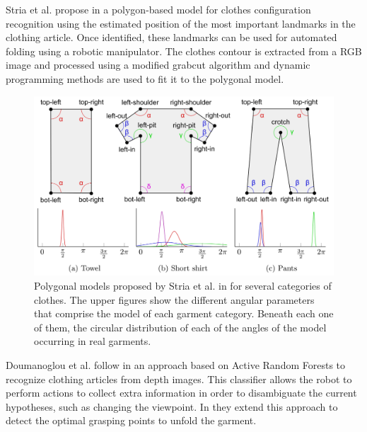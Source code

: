 Stria et al. propose in \cite{Stria2014, Stria2014IROS} a polygon-based model for clothes configuration recognition using the estimated position of the most important landmarks in the clothing article. Once identified, these landmarks can be used for automated folding using a robotic manipulator. The clothes contour is extracted from a RGB image and processed using a modified grabcut algorithm and dynamic programming methods are used to fit it to the polygonal model.

\begin{figure}[thpb]
    \centering
    \includegraphics[width=\textwidth]{figures/SOTA_Stria_2014-3.png}
    \caption[dummy]{Polygonal models proposed by Stria et al. in \cite{Stria2014} for several categories of clothes. The upper figures show the different angular parameters that comprise the model of each garment category. Beneath each one of them, the circular distribution of each of the angles of the model occurring in real garments.}
    \label{fig:SOTA_Stria_2014}
\end{figure}


Doumanoglou et al. follow in \cite{Doumanoglou2014ECCV} an approach based on Active Random Forests to recognize clothing articles from depth images. This classifier allows the robot to perform actions to collect extra information in order to disambiguate the current hypotheses, such as changing the viewpoint. In \cite{Doumanoglou2014ICRA} they extend this approach to detect the optimal grasping points to unfold the garment.


